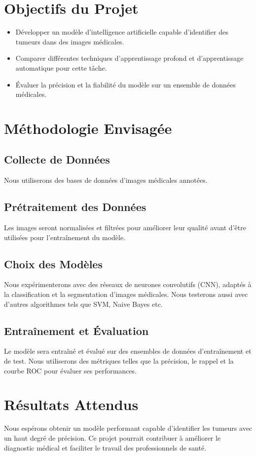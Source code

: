 \documentclass[a4paper,12pt]{article}
\begin{document}
\section{Objectifs du Projet}
\begin{itemize}
    \item Développer un modèle d'intelligence artificielle capable d'identifier des tumeurs dans des images médicales.
    \item Comparer différentes techniques d'apprentissage profond et d'apprentissage automatique pour cette tâche.
    \item Évaluer la précision et la fiabilité du modèle sur un ensemble de données médicales.
\end{itemize}

\section{Méthodologie Envisagée}
\subsection{Collecte de Données}
Nous utiliserons des bases de données d'images médicales annotées.

\subsection{Prétraitement des Données}
Les images seront normalisées et filtrées pour améliorer leur qualité avant d'être utilisées pour l'entraînement du modèle.

\subsection{Choix des Modèles}
Nous expérimenterons avec des réseaux de neurones convolutifs (CNN), adaptés à la classification et la segmentation d'images médicales. Nous testerons aussi avec d'autres algorithmes tels que SVM, Naive Bayes etc.

\subsection{Entraînement et Évaluation}
Le modèle sera entraîné et évalué sur des ensembles de données d'entraînement et de test. Nous utiliserons des métriques telles que la précision, le rappel et la courbe ROC pour évaluer ses performances.

\section{Résultats Attendus}
Nous espérons obtenir un modèle performant capable d'identifier les tumeurs avec un haut degré de précision. Ce projet pourrait contribuer à améliorer le diagnostic médical et faciliter le travail des professionnels de santé.
\end{document}
